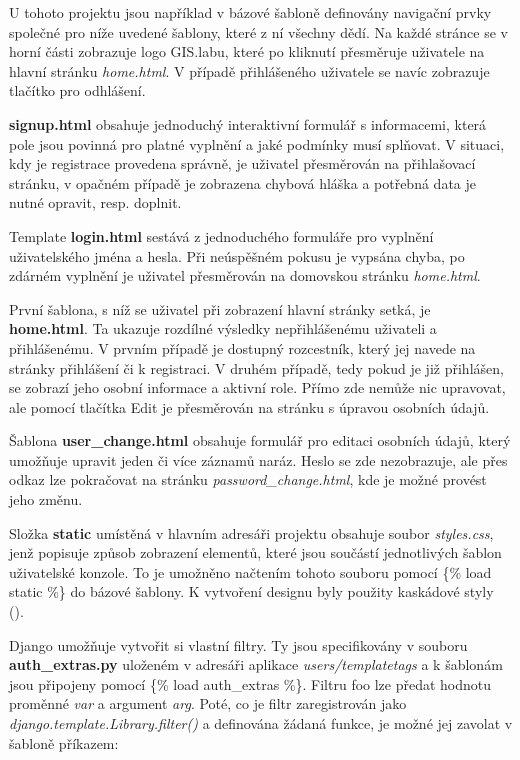 U tohoto projektu jsou například v bázové šabloně definovány navigační prvky společné pro níže uvedené šablony, které z ní všechny dědí. Na každé stránce se v horní části zobrazuje logo GIS.labu, které po kliknutí přesměruje uživatele na hlavní stránku \textit{home.html}. V případě přihlášeného uživatele se navíc zobrazuje tlačítko pro odhlášení.

\textbf{signup.html} obsahuje jednoduchý interaktivní formulář s informacemi, která pole jsou povinná pro platné vyplnění a jaké podmínky musí splňovat. V situaci, kdy je registrace provedena správně, je uživatel přesměrován na přihlašovací stránku, v opačném případě je zobrazena chybová hláška a potřebná data je nutné opravit, resp. doplnit.

Template \textbf{login.html} sestává z jednoduchého formuláře pro vyplnění uživatelského jména a hesla. Při neúspěšném pokusu je vypsána chyba, po zdárném vyplnění je uživatel přesměrován na domovskou stránku \textit{home.html}.

První šablona, s níž se uživatel při zobrazení hlavní stránky setká, je \textbf{home.html}. Ta ukazuje rozdílné výsledky nepřihlášenému uživateli a přihlášenému. V prvním případě je dostupný rozcestník, který jej navede na stránky přihlášení či k registraci. V druhém případě, tedy pokud je již přihlášen, se zobrazí jeho osobní informace a aktivní role. Přímo zde nemůže nic upravovat, ale pomocí tlačítka \textsf{Edit} je přesměrován na stránku s úpravou osobních údajů.

Šablona \textbf{user\_change.html} obsahuje formulář pro editaci osobních údajů, který umožňuje upravit jeden či více záznamů naráz. Heslo se zde nezobrazuje, ale přes odkaz lze pokračovat na stránku \textit{password\_change.html}, kde je možné provést jeho změnu.

Složka \textbf{static} umístěná v hlavním adresáři projektu obsahuje soubor \textit{styles.css}, jenž popisuje způsob zobrazení elementů, které jsou součástí jednotlivých šablon uživatelské konzole. To je umožněno načtením tohoto souboru pomocí \textsf{\{\% load static \%\}} do bázové šablony. K vytvoření designu byly použity kaskádové styly ().

Django umožňuje vytvořit si vlastní filtry. Ty jsou specifikovány v souboru \textbf{auth\_extras.py} uloženém v adresáři aplikace \textit{users/templatetags} a k šablonám jsou připojeny pomocí \textsf{\{\% load auth\_extras \%\}}. Filtru \textsf{foo} lze předat hodnotu proměnné \textit{var} a argument \textit{arg}. Poté, co je filtr zaregistrován jako \textit{django.template.Library.filter()} a definována žádaná funkce, je možné jej zavolat v šabloně příkazem:

